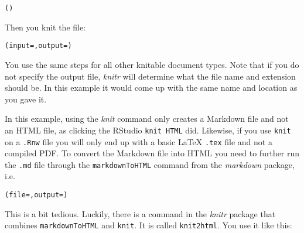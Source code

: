 {{\begin{knitrout}
\color{fgcolor}\begin{kframe}
\begin{alltt}
()
\end{alltt}
\end{kframe}
\end{knitrout}


\noindent Then you knit the file:

\begin{knitrout}
\color{fgcolor}\begin{kframe}
\begin{alltt}
(input = , output = )
\end{alltt}
\end{kframe}
\end{knitrout}


\noindent You use the same steps for all other knitable document types. Note that if you do not specify the output file, {\emph{knitr}} will determine what the file name and extension should be. In this example it would come up with the same name and location as you gave it.

In this example, using the {\emph{knit}} command only creates a Markdown file and not an HTML file, as clicking the RStudio {\tt{knit HTML}} did. Likewise, if you use {\tt{knit}} on a {\tt{.Rnw}} file you will only end up with a basic LaTeX {\tt{.tex}} file and not a compiled PDF. To convert the Markdown file into HTML you need to further run the {\tt{.md}} file through the {\tt{markdownToHTML}} command from the {\emph{markdown}} package, i.e.

\begin{knitrout}
\color{fgcolor}\begin{kframe}
\begin{alltt}
(file = , output = )
\end{alltt}
\end{kframe}
\end{knitrout}


\noindent This is a bit tedious. Luckily, there is a command in the {\emph{knitr}} package that combines \texttt{markdownToHTML} and \texttt{knit}. It is called \texttt{knit2html}. You use it like this:

}}
